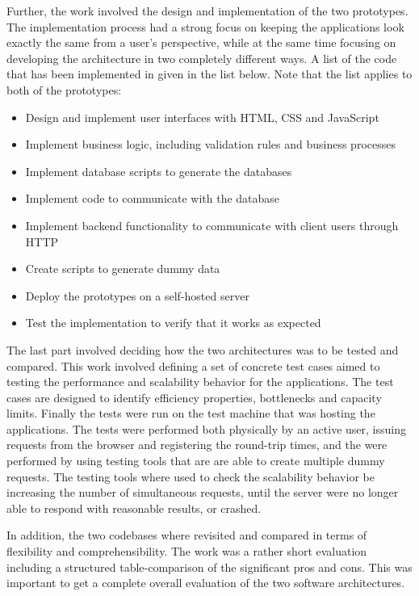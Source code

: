 Further, the work involved the design and implementation of the two prototypes. The implementation process had a strong focus on keeping the applications look exactly the same from a user's perspective, while at the same time focusing on developing the architecture in two completely different ways. A list of the code that has been implemented in given in the list below. Note that the list applies to both of the prototypes:
\begin{itemize}
\item{} Design and implement user interfaces with HTML, CSS and JavaScript
\item{} Implement business logic, including validation rules and business processes 
\item{} Implement database scripts to generate the databases
\item{} Implement code to communicate with the database
\item{} Implement backend functionality to communicate with client users through HTTP
\item{} Create scripts to generate dummy data
\item{} Deploy the prototypes on a self-hosted server
\item{} Test the implementation to verify that it works as expected
\end{itemize}

The last part involved deciding how the two architectures was to be tested and compared. This work involved defining a set of concrete test cases aimed to testing the performance and scalability behavior for the applications. The test cases are designed to identify efficiency properties, bottlenecks and capacity limits. Finally the tests were run on the test machine that was hosting the applications. The tests were performed both physically by an active user, issuing requests from the browser and registering the round-trip times, and the were performed by using testing tools that are are able to create multiple dummy requests. The testing tools where used to check the scalability behavior be increasing the number of simultaneous requests, until the server were no longer able to respond with reasonable results, or crashed. 

In addition, the two codebases where revisited and compared in terms of flexibility and comprehensibility. The work was a rather short evaluation including a structured table-comparison of the significant pros and cons. This was important to get a complete overall evaluation of the two software architectures.

